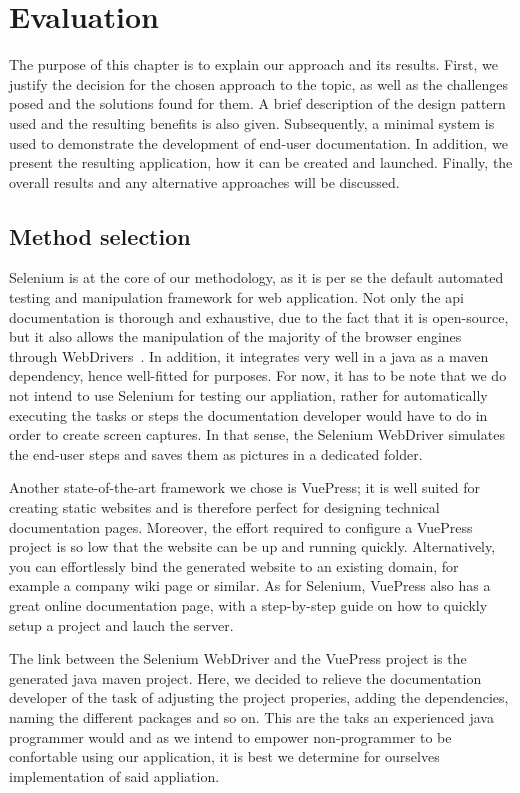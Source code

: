 \chapter{Evaluation}\label{ch:eval}
The purpose of this chapter is to explain our approach and its results. First, we justify the decision for the chosen approach to the topic, as well as the challenges posed and the solutions found for them. A brief description of the design pattern used and the resulting benefits is also given. Subsequently, a minimal system is used to demonstrate the development of end-user documentation. In addition, we present the resulting application, how it can be created and launched. Finally, the overall results and any alternative approaches will be discussed.

\section{Method selection}\label{sec:meth}

Selenium is at the core of our methodology, as it is per se the default automated testing and manipulation framework for web application. Not only the \acrshort{api} documentation is thorough and exhaustive, due to the fact that it is open-source, but it also allows the manipulation of the majority of the browser engines through WebDrivers~\cite{sel}. In addition, it integrates very well in a java as a maven dependency, hence well-fitted for purposes. For now, it has to be note that we do not intend to use Selenium for testing our appliation, rather for automatically executing the tasks or steps the documentation developer would have to do in order to create screen captures. In that sense, the Selenium WebDriver simulates the end-user steps and saves them as pictures in a dedicated folder.

Another state-of-the-art framework we chose is VuePress; it is well suited for creating static websites and is therefore perfect for designing technical documentation pages. Moreover, the effort required to configure a VuePress project is so low that the website can be up and running quickly. Alternatively, you can effortlessly bind the generated website to an existing domain, for example a company wiki page or similar. As for Selenium, VuePress also has a great online documentation page, with a step-by-step guide on how to quickly setup a project and lauch the server.

The link between the Selenium WebDriver and the VuePress project is the generated java maven project. Here, we decided to relieve the documentation developer of the task of adjusting the project properies, adding the dependencies, naming the different packages and so on. This are the taks an experienced java programmer would and as we intend to empower non-programmer to be confortable using our application, it is best we determine for ourselves implementation of said appliation.

